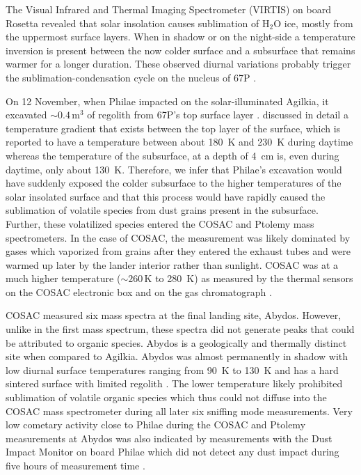\documentclass{aa}
\begin{document}
The Visual Infrared and Thermal Imaging Spectrometer (VIRTIS) on board Rosetta revealed that solar insolation causes sublimation of $\mathrm{H_2O}$ ice, mostly from the uppermost surface layers. When in shadow or on the night-side a temperature inversion is present between the now colder surface and a subsurface that remains warmer for a longer duration. These observed diurnal variations probably trigger the sublimation-condensation cycle on the nucleus of 67P \citep[][see also below]{desanctis2015}.

On 12 November, when Philae impacted on the solar-illuminated Agilkia, it excavated $\sim 0.4\,\mathrm{m^3}$ 
of regolith from 67P's top surface layer \citep{biele2015}. \citet{desanctis2015}  discussed 
in detail a temperature gradient that exists between the top layer of the surface, which is 
reported to have a temperature between about 180~K and 230~K during daytime whereas the temperature of the 
subsurface, at a depth of 4~cm is, even during  daytime,  only about 130~K. Therefore, we infer
that Philae's 
excavation would have suddenly exposed the colder subsurface to the higher temperatures of the 
solar insolated surface and that this process would have rapidly caused the sublimation of volatile species from dust grains
present in the subsurface. Further, these volatilized species entered 
the COSAC and Ptolemy mass spectrometers. In the case of COSAC, the measurement was  likely dominated by gases which 
vaporized from grains after they entered the exhaust tubes and were warmed up later by the lander 
interior rather than sunlight. COSAC 
was at a much higher temperature ($\sim 260\,\mathrm{K}$ to 280~K) as measured by the thermal 
sensors on the COSAC electronic box and on the gas chromatograph \citep{goesmann2015,cozzoni2016}.

COSAC measured six mass spectra at the final landing site, Abydos. However, unlike in the first mass 
spectrum, these spectra did not generate peaks that could be attributed to organic species. 
Abydos is a geologically and thermally distinct site when compared to Agilkia. Abydos was almost
permanently in shadow with low diurnal surface temperatures ranging from 90~K to 130~K and 
has a hard sintered surface with limited regolith \citep{spohn2015}. The lower temperature  likely
prohibited sublimation of volatile organic species which thus could not diffuse into the COSAC 
mass spectrometer during all later six sniffing mode measurements.  Very low cometary activity  
close to Philae during the COSAC and Ptolemy measurements at Abydos was also indicated by measurements 
with the Dust Impact Monitor on board Philae which did not detect any dust impact during five hours 
of measurement time \citep{krueger2015b}.
 
\end{document}
